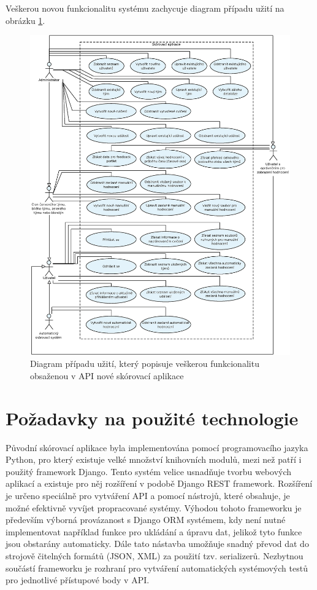 \documentclass[
  digital, %
  twoside, %
  table,   %
  nolof,     %
  nolot,     %
]{fithesis3}
\begin{document}
Veškerou novou funkcionalitu systému zachycuje diagram případu užití na obrázku \ref{fig:useCase2}.

\begin{figure}
    \centering
    \includegraphics[width=15cm]{images/Use-case-2.eps}
    \caption{Diagram případu užití, který popisuje veškerou funkcionalitu obsaženou v API nové skórovací aplikace}
    \label{fig:useCase2}
\end{figure}

\section{Požadavky na použité technologie}

Původní skórovací aplikace byla implementována pomocí programovacího jazyka Python, pro který existuje velké množství knihovních modulů, mezi než patří i použitý framework Django. Tento systém velice usnadňuje tvorbu webových aplikací a existuje pro něj rozšíření v podobě Django REST framework. Rozšíření je určeno speciálně pro vytváření API a pomocí nástrojů, které obsahuje, je možné efektivně vyvíjet propracované systémy. Výhodou tohoto frameworku je především výborná provázanost s Django ORM systémem, kdy není nutné implementovat například funkce pro ukládání a úpravu dat, jelikož tyto funkce jsou obstarány automaticky. Dále tato nástavba umožňuje snadný převod dat do strojově čitelných formátů (JSON, XML) za použití tzv. serializerů. Nezbytnou součástí frameworku je rozhraní pro vytváření automatických systémových testů pro jednotlivé přístupové body v API.
\end{document}
